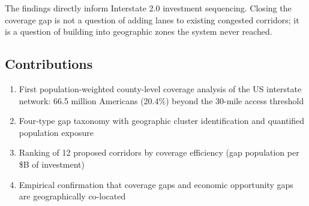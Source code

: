 The findings directly inform Interstate 2.0 investment sequencing. Closing the coverage gap is not a question of adding lanes to existing congested corridors; it is a question of building into geographic zones the system never reached.

\subsection*{Contributions}

\begin{enumerate}
\item First population-weighted county-level coverage analysis of the US interstate network: 66.5 million Americans (20.4\%) beyond the 30-mile access threshold
\item Four-type gap taxonomy with geographic cluster identification and quantified population exposure
\item Ranking of 12 proposed corridors by coverage efficiency (gap population per \$B of investment)
\item Empirical confirmation that coverage gaps and economic opportunity gaps are geographically co-located
\end{enumerate}
